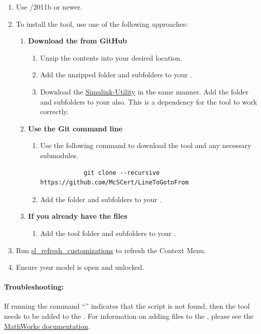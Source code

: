 \documentclass{article}
\begin{document}
\begin{enumerate}
  \item Use \Matlab/\Simulink 2011b or newer.
	\item To install the tool, use one of the following approaches:
	\begin{enumerate}
		\item \textbf{Download the  from GitHub}
		\begin{enumerate} 
			\item Unzip the contents into your desired location. 
			\item Add the unzipped folder and subfolders to your \mpath. 
			\item Download the \href{https://github.com/McSCert/Simulink-Utility}{Simulink-Utility} in the same manner. Add the folder and subfolders to your \mpath also. This is a dependency for the tool to work correctly.
		\end{enumerate}
		\item \textbf{Use the Git command line}
		\begin{enumerate}
			\item Use the following command to download the tool and any necessary submodules. 
			\begin{verbatim}
			git clone --recursive https://github.com/McSCert/LineToGotoFrom
			\end{verbatim}
			\item Add the folder and subfolders to your \mpath. 
		\end{enumerate}
		\item \textbf{If you already have the files}
		\begin{enumerate}
			\item Add the tool folder and subfolders to your \mpath. 
		\end{enumerate}
	\end{enumerate}
	\item Run \href{https://www.mathworks.com/help/simulink/ug/registering-customizations.html}{sl\_refresh\_customizations} to refresh the Context Menu. 
	\item Ensure your model is open and unlocked.
\end{enumerate}

\paragraph{Troubleshooting:}  If running the command ``'' indicates that the script is not found, then the tool needs to be added to the \mpath.	For information on adding files to the \mpath, please see the \href{https://www.mathworks.com/help/matlab/matlab_env/add-remove-or-reorder-folders-on-the-search-path.html}{MathWorks documentation}.
\end{document}
